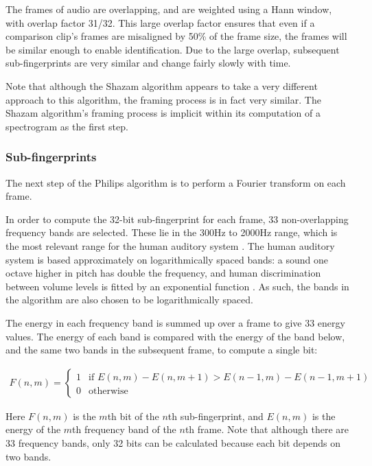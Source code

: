 \documentclass[12pt,a4paper,twoside,openright]{report}
\begin{document}
The frames of audio are overlapping, and are weighted using a Hann window, with overlap factor 31/32. This large overlap factor ensures that even if a comparison clip's frames are misaligned by 50\% of the frame size, the frames will be similar enough to enable identification. Due to the large overlap, subsequent sub-fingerprints are very similar and change fairly slowly with time. 

Note that although the Shazam algorithm appears to take a very different approach to this algorithm, the framing process is in fact very similar. The Shazam algorithm's framing process is implicit within its computation of a spectrogram as the first step.

\subsubsection{Sub-fingerprints}

The next step of the Philips algorithm is to perform a Fourier transform on each frame.

In order to compute the 32-bit sub-fingerprint for each frame, 33 non-overlapping frequency bands are selected. These lie in the 300Hz to 2000Hz range, which is the most relevant range for the human auditory system \cite{Haitsma02}. The human auditory system is based approximately on logarithmically spaced bands: a sound one octave higher in pitch has double the frequency, and human discrimination between volume levels is fitted by an exponential function \cite{Jesteadt77}. As such, the bands in the algorithm are also chosen to be logarithmically spaced.

The energy in each frequency band is summed up over a frame to give 33 energy values. The energy of each band is compared with the energy of the band below, and the same two bands in the subsequent frame, to compute a single bit:

\begin{align*}
  F(n,m)=
  \begin{cases}
      1 & \text{if } E(n,m)-E(n,m+1) > E(n-1,m)-E(n-1,m+1)\\
      0 & \text{otherwise}
  \end{cases}
\end{align*}

Here $F(n,m)$ is the $m$th bit of the $n$th sub-fingerprint, and $E(n,m)$ is the energy of the $m$th frequency band of the $n$th frame. Note that although there are 33 frequency bands, only 32 bits can be calculated because each bit depends on two bands.
\end{document}
